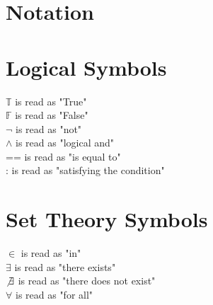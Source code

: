 \documentclass[11pt]{article}
\begin{document}
\section*{Notation}



\section*{Logical Symbols}
$\mathbb{T}$ is read as "True"\\
$\mathbb{F}$ is read as "False"\\
$\lnot$ is read as "not"\\
$\land$ is read as "logical and"\\
== is read as "is equal to"\\
: is read as "satisfying the condition"\\




\section*{Set Theory Symbols}
$\in$ is read as "in"\\
$\exists$ is read as "there exists"\\
$\not \exists$ is read as "there does not exist"\\
$\forall$ is read as "for all"
\end{document}
